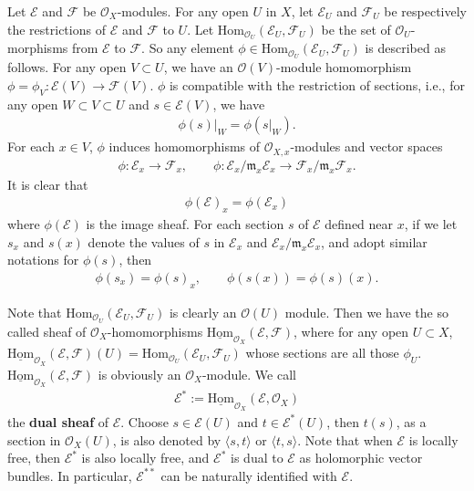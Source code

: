 \documentclass[12pt,b5paper,notitlepage]{report}
\theoremstyle{definition}
\theoremstyle{plain}
\newcommand{\fk}{\mathfrak}
\newcommand{\Hom}{\mathrm{Hom}}
\newcommand{\bk}[1]{\langle {#1}\rangle}
\newcommand{\scr}{\mathscr}
\newcommand{\shom}{\underline{\Hom}}
\numberwithin{equation}{section}
\begin{document}
Let $\scr E$ and $\scr F$ be $\scr O_X$-modules. For any open $U$ in $X$, let $\scr E_U$ and $\scr F_U$ be respectively the restrictions of $\scr E$ and $\scr F$ to $U$. Let $\Hom_{\scr O_U}(\scr E_U,\scr F_U)$ \index{Hom@$\Hom_{\scr O_U}(\scr E_U,\scr F_U)$} be the set of $\scr O_U$-morphisms from $\scr E$ to $\scr F$. So any element  $\phi\in\Hom_{\scr O_U}(\scr E_U,\scr F_U)$ is
described as follows. For any open $V\subset U$, we have an $\scr O(V)$-module homomorphism $\phi=\phi_V:\scr E(V)\rightarrow \scr F(V)$. $\phi$ is compatible with the restriction of sections, i.e., for any open $W\subset V\subset U$ and $s\in\scr E(V)$, we have 
\begin{align*}
\phi(s)|_W=\phi(s|_W).
\end{align*}
For each $x\in V$, $\phi$ induces homomorphisms of $\scr O_{X,x}$-modules and vector spaces
\begin{gather}
\phi:\scr E_x\rightarrow\scr F_x,\qquad \phi:\scr E_x/\fk m_x\scr E_x\rightarrow \scr F_x/\fk m_x\scr F_x.\label{eq223}
\end{gather}
It is clear that
\begin{align}
\phi(\scr E)_x=\phi(\scr E_x)	
\end{align}
where $\phi(\scr E)$ is the image sheaf. For each section $s$ of $\scr E$ defined near $x$, if we let $s_x$ and $s(x)$ denote the values of $s$ in $\scr E_x$ and $\scr E_x/\fk m_x\scr E_x$, and adopt similar notations for $\phi(s)$, then
\begin{gather}
\phi(s_x)=\phi(s)_x,\qquad \phi(s(x))=\phi(s)(x).\label{eq224}
\end{gather}


Note that  $\Hom_{\scr O_U}(\scr E_U,\scr F_U)$ is clearly an $\scr O(U)$ module. Then we have the so called sheaf of $\scr O_X$-homomorphisms $\shom_{\scr O_X}(\scr E,\scr F)$, \index{Hom@$\shom_{\scr O_X}(\scr E,\scr F)$} where for any open  $U\subset X$, $\shom_{\scr O_X}(\scr E,\scr F)(U)=\Hom_{\scr O_U}(\scr E_U,\scr F_U)$ whose sections are all those $\phi_U$. $\shom_{\scr O_X}(\scr E,\scr F)$ is obviously an $\scr O_X$-module.  We call 
\begin{align*}
\scr E^*:=\shom_{\scr O_X}(\scr E,\scr O_X)
\end{align*}
the \textbf{dual sheaf} of $\scr E$. \index{E@$\scr E^*$} Choose $s\in\scr E(U)$ and $t\in\scr E^*(U)$, then $t(s)$, as a section in $\scr O_X(U)$, is also denoted by $\bk{s,t}$ or $\bk{t,s}$.  Note that when $\scr E$ is locally free, then $\scr E^*$ is also locally free, and $\scr E^*$ is dual to $\scr E$ as holomorphic vector bundles. In particular, $\scr E^{**}$ can be naturally identified with $\scr E$. 
\end{document}
